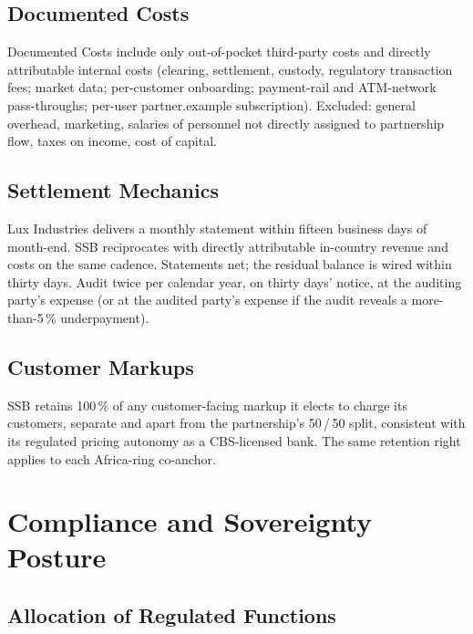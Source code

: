 \documentclass[11pt,letterpaper]{article}
\begin{document}
\subsection{Documented Costs}
Documented Costs include only out-of-pocket third-party costs and
directly attributable internal costs (clearing, settlement, custody,
regulatory transaction fees; market data; per-customer onboarding;
payment-rail and ATM-network pass-throughs; per-user partner.example
subscription). Excluded: general overhead, marketing, salaries of
personnel not directly assigned to partnership flow, taxes on income,
cost of capital.

\subsection{Settlement Mechanics}
Lux Industries delivers a monthly statement within fifteen business
days of month-end. SSB reciprocates with directly attributable
in-country revenue and costs on the same cadence. Statements net; the
residual balance is wired within thirty days. Audit twice per calendar
year, on thirty days' notice, at the auditing party's expense (or at
the audited party's expense if the audit reveals a more-than-5\,\%
underpayment).

\subsection{Customer Markups}
SSB retains 100\,\% of any customer-facing markup it elects to charge
its customers, separate and apart from the partnership's 50\,/\,50
split, consistent with its regulated pricing autonomy as a CBS-licensed
bank. The same retention right applies to each Africa-ring co-anchor.

\section{Compliance and Sovereignty Posture}

\subsection{Allocation of Regulated Functions}
\end{document}

